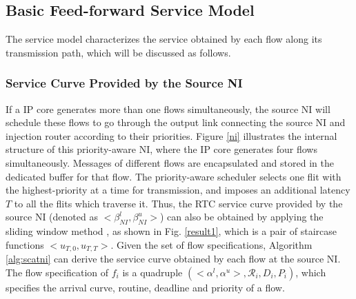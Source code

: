 \documentclass[preprint]{elsarticle}
\begin{document}
\subsection{Basic Feed-forward Service Model}\label{sm}
The service model characterizes the service obtained by each flow along its transmission path, which will be discussed as follows.

\subsubsection{Service Curve Provided by the Source NI}
If a IP core generates more than one flows simultaneously, the source NI will schedule these flows to go through the output link connecting the source NI and injection router according to their priorities. Figure \ref{ni} illustrates the internal structure of this priority-aware NI, where the IP core generates four flows simultaneously. Messages of different flows are encapsulated and stored in the dedicated buffer for that flow. The priority-aware scheduler selects one flit with the highest-priority at a time for transmission, and imposes an additional latency $T$ to all the flits which traverse it. Thus, the RTC service curve provided by the source NI (denoted as $<\beta^l_{NI},\beta^u_{NI}>$) can also be obtained by applying the sliding window method \cite{1253607}, as shown in Fig. \ref{result1}, which is a pair of staircase functions $<u_{T,0},u_{T,T}>$. Given the set of flow specifications, Algorithm \ref{alg:scatni} can derive the service curve obtained by each flow at the source NI. The flow specification of $f_i$ is a quadruple $(<\alpha^l,\alpha^u>,\mathcal{R}_i,D_i,P_i)$, which specifies the arrival curve, routine, deadline and priority of a flow.
\end{document}
